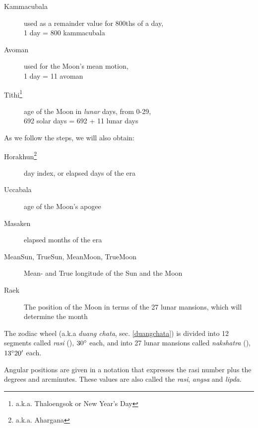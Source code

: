 \documentclass[11pt,oneside]{memoir-article}
\begin{document}
\savenotes

\begin{description}
\item[{Kammacubala }] used as a remainder value for 800ths of a day,\\
  1 day = 800 kammacubala
\item[{Avoman }] used for the Moon's mean motion,\\ 1 day = 11 avoman
\item[{Tithi\footnote{a.k.a. Thaloengsok or New Year's Day} }] age of the Moon in \emph{lunar} days, from 0-29, \\
  692 solar days = 692 + 11 lunar days
\end{description}

As we follow the steps, we will also obtain:

\begin{description}
\item[{Horakhun\footnote{a.k.a. Ahargana} }] day index, or elapsed days of the era
\item[{Uccabala }] age of the Moon's apogee
\item[{Masaken }] elapsed months of the era

\item[{MeanSun, TrueSun, MeanMoon, TrueMoon}] Mean- and True longitude of the Sun and the Moon
\item[{Raek}] The position of the Moon in terms of the 27 lunar mansions, which will determine the month
\end{description}


\spewnotes

The zodiac wheel (a.k.a \emph{duang chata}, sec. \ref{duangchata}) is divided into 12
segments called \emph{rasi} (), $30^\circ$ each, and into 27 lunar
mansions called \emph{nakshatra} (), $13^\circ 20^\prime$ each.

Angular positions are given in a notation that expresses the rasi number plus
the degrees and arcminutes. These values are also called the \emph{rasi}, \emph{angsa} and
\emph{lipda}.
\end{document}

